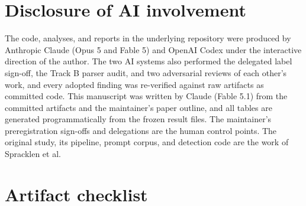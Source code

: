 \documentclass[10pt,twocolumn,letterpaper]{article}
\begin{document}
\section*{Disclosure of AI involvement}

The code, analyses, and reports in the underlying repository were produced by Anthropic Claude
(Opus 5 and Fable 5) and OpenAI Codex under the interactive direction of the author. The two AI
systems also performed the delegated label sign-off, the Track B parser audit, and two adversarial
reviews of each other's work, and every adopted finding was re-verified against raw artifacts as
committed code. This manuscript was written by Claude (Fable 5.1) from the committed artifacts and
the maintainer's paper outline, and all tables are generated programmatically from the frozen result
files. The maintainer's preregistration sign-offs and delegations are the human control points. The
original study, its pipeline, prompt corpus, and detection code are the work of Spracklen et al.




\clearpage
\onecolumn
\appendix

\section{Artifact checklist}
\label{app:artifacts}
\end{document}
